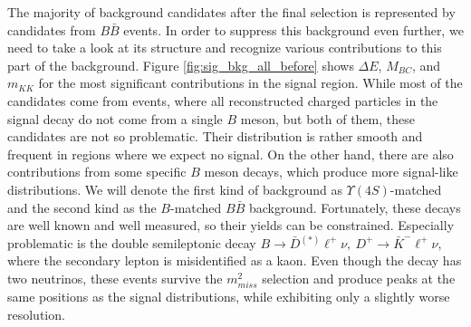 The majority of background candidates after the final selection is represented by candidates from $B \bar B$ events. In order to suppress this background even further, we need to take a look at its structure and recognize various contributions to this part of the background. Figure \ref{fig:sig_bkg_all_before} shows $\Delta E$, $M_{BC}$, and $m_{KK}$ for the most significant contributions in the signal region. While most of the candidates come from events, where all reconstructed charged particles in the signal decay do not come from a single $B$ meson, but both of them, these candidates are not so problematic. Their distribution is rather smooth and frequent in regions where we expect no signal. On the other hand, there are also contributions from some specific $B$ meson decays, which produce more signal-like distributions. We will denote the first kind of background as $\Upsilon(4S)$-matched and the second kind as the $B$-matched $B \bar B$ background. Fortunately, these decays are well known and well measured, so their yields can be constrained. Especially problematic is the double semileptonic decay $B \to \bar D {}^{(*)} \ell^+ \nu,~D^+ \to \bar K^- \ell^+ \nu$, where the secondary lepton is misidentified as a kaon. Even though the decay has two neutrinos, these events survive the $m_{miss}^2$ selection and produce peaks at the same positions as the signal distributions, while exhibiting only a slightly worse resolution. 

